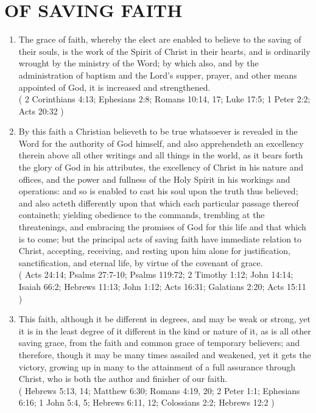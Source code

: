 \documentclass[12pt,a4paper]{book}
\begin{document}
\chapter{OF SAVING FAITH}
\label{ch-sav-fai}
\begin{enumerate}
\item The grace of faith, whereby the elect are enabled to believe to the saving of their souls, is the work of the Spirit of Christ in their hearts, and is ordinarily wrought by the ministry of the Word; by which also, and by the administration of baptism and the Lord's supper, prayer, and other means appointed of God, it is increased and strengthened.\\
( 2 Corinthians 4:13; Ephesians 2:8; Romans 10:14, 17; Luke 17:5; 1 Peter 2:2; Acts 20:32 )
\item By this faith a Christian believeth to be true whatsoever is revealed in the Word for the authority of God himself, and also apprehendeth an excellency therein above all other writings and all things in the world, as it bears forth the glory of God in his attributes, the excellency of Christ in his nature and offices, and the power and fullness of the Holy Spirit in his workings and operations: and so is enabled to cast his soul upon the truth thus believed; and also acteth differently upon that which each particular passage thereof containeth; yielding obedience to the commands, trembling at the threatenings, and embracing the promises of God for this life and that which is to come; but the principal acts of saving faith have immediate relation to Christ, accepting, receiving, and resting upon him alone for justification, sanctification, and eternal life, by virtue of the covenant of grace.\\
( Acts 24:14; Psalms 27:7-10; Psalms 119:72; 2 Timothy 1:12; John 14:14; Isaiah 66:2; Hebrews 11:13; John 1:12; Acts 16:31; Galatians 2:20; Acts 15:11 )
\item This faith, although it be different in degrees, and may be weak or strong, yet it is in the least degree of it different in the kind or nature of it, as is all other saving grace, from the faith and common grace of temporary believers; and therefore, though it may be many times assailed and weakened, yet it gets the victory, growing up in many to the attainment of a full assurance through Christ, who is both the author and finisher of our faith.\\
( Hebrews 5:13, 14; Matthew 6:30; Romans 4:19, 20; 2 Peter 1:1; Ephesians 6:16; 1 John 5:4, 5; Hebrews 6:11, 12; Colossians 2:2; Hebrews 12:2 )
\end{enumerate}
\end{document}
